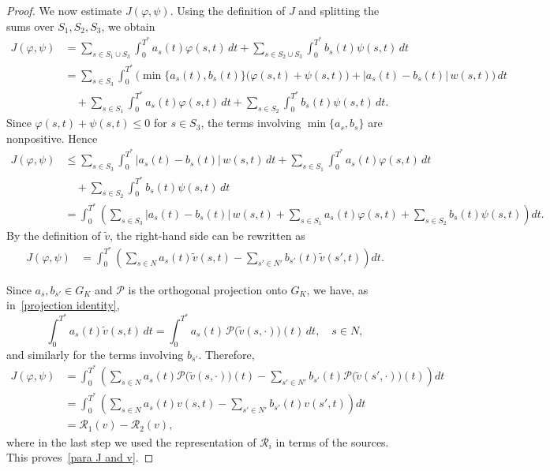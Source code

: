 \documentclass[12pt]{amsart}
\begin{document}
\begin{proof}
    We now estimate \(J(\varphi,\psi)\). Using the definition of \(J\) and splitting the sums over \(S_1,S_2,S_3\), we obtain
    \begin{align*}
    J(\varphi, \psi) 
    &= \sum_{s \in S_1 \cup S_3} \int_0^{T^*} a_s(t) \varphi(s, t) \, dt 
    + \sum_{s \in S_2 \cup S_3} \int_0^{T^*} b_s(t) \psi(s, t) \, dt \\
    &= \sum_{s \in S_3} \int_0^{T^*} 
        \Big(
        \min\{a_s(t), b_s(t)\}\big(\varphi(s, t) + \psi(s, t)\big)
        + |a_s(t) - b_s(t)|\, w(s, t)
        \Big)\, dt \\
    &\quad + \sum_{s \in S_1} \int_0^{T^*} a_s(t) \varphi(s, t) \, dt
        + \sum_{s \in S_2} \int_0^{T^*} b_s(t) \psi(s, t) \, dt.
    \end{align*}
    Since \(\varphi(s, t) + \psi(s, t) \leq 0\) for \(s\in S_3\), the terms involving \(\min\{a_s,b_s\}\) are nonpositive. Hence
    \begin{align*}
    J(\varphi, \psi) 
    &\leq \sum_{s \in S_3} \int_0^{T^*} |a_s(t) - b_s(t)|\, w(s, t)\,dt
    + \sum_{s \in S_1} \int_0^{T^*} a_s(t) \varphi(s, t)\,dt \\
    &\quad + \sum_{s \in S_2} \int_0^{T^*} b_s(t) \psi(s, t)\,dt \\
    &= \int_0^{T^*} \left( 
        \sum_{s \in S_3} |a_s(t) - b_s(t)|\, w(s, t) 
        + \sum_{s \in S_1} a_s(t) \varphi(s, t) 
        + \sum_{s \in S_2} b_s(t) \psi(s, t)
        \right) dt.
    \end{align*}
    By the definition of \(\tilde{v}\), the right-hand side can be rewritten as
    \begin{align*}
    J(\varphi, \psi) 
    &= \int_0^{T^*} \left( 
        \sum_{s \in N} a_s(t) \tilde{v}(s, t) 
        - \sum_{s' \in N'} b_{s'}(t) \tilde{v}(s', t) 
        \right) dt.
    \end{align*}

    Since \(a_s,b_{s'}\in G_K\) and \(\mathcal{P}\) is the orthogonal projection onto \(G_K\), we have, as in~\eqref{projection identity},
    \[
    \int_0^{T^*} a_s(t) \tilde{v}(s,t)\,dt
    = \int_0^{T^*} a_s(t)\,\mathcal{P}\big(\tilde{v}(s,\cdot)\big)(t)\,dt,
    \quad s\in N,
    \]
    and similarly for the terms involving \(b_{s'}\). Therefore,
    \begin{align*}
    J(\varphi,\psi)
    &= \int_0^{T^*} \left( 
        \sum_{s \in N} a_s(t) \mathcal{P}\big(\tilde{v}(s,\cdot)\big)(t) 
        - \sum_{s' \in N'} b_{s'}(t) \mathcal{P}\big(\tilde{v}(s',\cdot)\big)(t) 
        \right) dt \\
    &= \int_0^{T^*} \left( 
        \sum_{s \in N} a_s(t) v(s, t) 
        - \sum_{s' \in N'} b_{s'}(t) v(s', t) 
        \right) dt \\
    &= \mathcal{R}_1(v) - \mathcal{R}_2(v),
    \end{align*}
    where in the last step we used the representation of \(\mathcal{R}_i\) in terms of the sources.  
    This proves~\eqref{para J and v}.

\end{proof}
 
\end{document}
